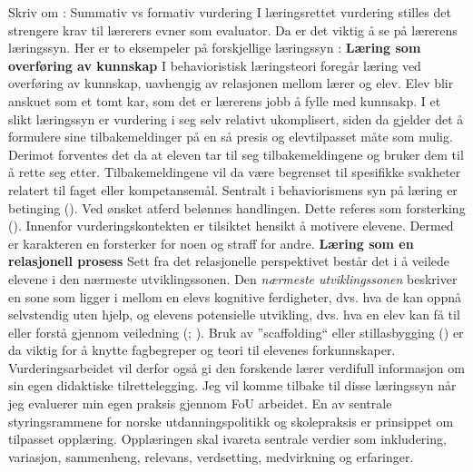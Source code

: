 \documentclass[main.tex]{subfiles}
\begin{document}
Skriv om : Summativ vs formativ vurdering
\newline
\newline
I læringsrettet vurdering stilles det strengere krav til lærerers evner som evaluator. Da er det viktig å se på lærerens læringssyn. 
Her er to eksempeler på forskjellige læringssyn :
\newline
\newline
\textbf{Læring som overføring av kunnskap}
\newline
I behavioristisk læringsteori foregår læring ved overføring av kunnskap, uavhengig av relasjonen mellom lærer 
og elev. Elev blir anskuet som et tomt kar, som det er lærerens jobb å fylle med kunnsakp. 
I et slikt læringssyn er vurdering i seg selv relativt ukomplisert, siden da gjelder det å 
formulere sine tilbakemeldinger på en så presis og elevtilpasset måte som mulig.
Derimot forventes det da at eleven tar til seg tilbakemeldingene og bruker dem til å rette seg etter.
Tilbakemeldingene vil da være begrenset til spesifikke svakheter relatert til faget eller kompetansemål.
Sentralt i behaviorismens syn på læring er betinging (). Ved ønsket atferd belønnes 
handlingen. Dette referes som forsterking (). Innenfor vurderingskontekten er
tilsiktet hensikt å motivere elevene. Dermed er karakteren en forsterker for noen og straff for andre.
\newline
\newline
\textbf{Læring som en relasjonell prosess}
\newline
Sett fra det relasjonelle perspektivet består det i å veilede elevene i den nærmeste utviklingssonen.
Den \emph{nærmeste utviklingssonen} beskriver en sone som ligger i mellom en elevs kognitive 
ferdigheter, dvs. hva de kan oppnå selvstendig uten hjelp, og elevens potensielle utvikling, dvs. 
hva en elev kan få til eller forstå gjennom veiledning (; ). 
Bruk av ''scaffolding`` eller stillasbygging () er da viktig for å knytte fagbegreper og teori til elevenes 
forkunnskaper. Vurderingsarbeidet vil derfor også gi den forskende lærer  verdifull informasjon om sin egen didaktiske tilrettelegging.
Jeg vil komme tilbake til disse læringssyn når jeg evaluerer min egen praksis gjennom FoU arbeidet.
\newline
\newline
En av sentrale styringsrammene for norske utdanningspolitikk og skolepraksis er prinsippet om tilpasset opplæring.
Opplæringen skal ivareta sentrale verdier som inkludering, variasjon, sammenheng, relevans, verdsetting, medvirkning og erfaringer.
\end{document}
